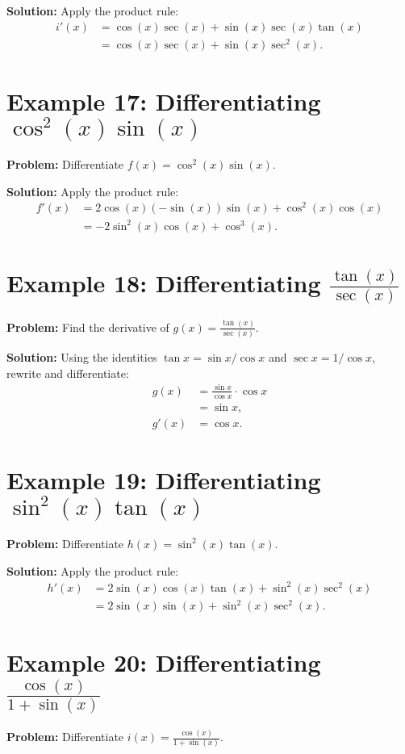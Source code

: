 \documentclass[a4paper,12pt]{book}
\begin{document}
\textbf{Solution:}
Apply the product rule:
\begin{align*}
i'(x) &= \cos(x)\sec(x) + \sin(x)\sec(x)\tan(x) \\
&= \cos(x)\sec(x) + \sin(x)\sec^2(x).
\end{align*}


\section*{Example 17: Differentiating $\cos^2(x)\sin(x)$}
\textbf{Problem:} Differentiate $f(x) = \cos^2(x)\sin(x)$.

\textbf{Solution:}
Apply the product rule:
\begin{align*}
f'(x) &= 2\cos(x)(-\sin(x))\sin(x) + \cos^2(x)\cos(x) \\
&= -2\sin^2(x)\cos(x) + \cos^3(x).
\end{align*}

\section*{Example 18: Differentiating $\frac{\tan(x)}{\sec(x)}$}
\textbf{Problem:} Find the derivative of $g(x) = \frac{\tan(x)}{\sec(x)}$.

\textbf{Solution:}
Using the identities $\tan x = \sin x / \cos x$ and $\sec x = 1 / \cos x$, rewrite and differentiate:
\begin{align*}
g(x) &= \frac{\sin x}{\cos x} \cdot \cos x \\
&= \sin x, \\
g'(x) &= \cos x.
\end{align*}

\section{Example 19: Differentiating $\sin^2(x)\tan(x)$}
\textbf{Problem:} Differentiate $h(x) = \sin^2(x)\tan(x)$.

\textbf{Solution:}
Apply the product rule:
\begin{align*}
h'(x) &= 2\sin(x)\cos(x)\tan(x) + \sin^2(x)\sec^2(x) \\
&= 2\sin(x)\sin(x) + \sin^2(x)\sec^2(x).
\end{align*}

\section*{Example 20: Differentiating $\frac{\cos(x)}{1 + \sin(x)}$}
\textbf{Problem:} Differentiate $i(x) = \frac{\cos(x)}{1 + \sin(x)}$.
\end{document}
